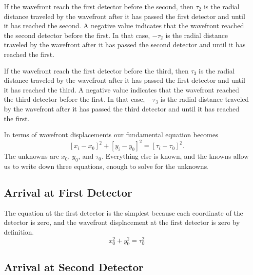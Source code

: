 \documentclass[twocolumn]{article}
\begin{document}
If the wavefront reach the first detector before the second, then $\tau_2$ is
the radial distance traveled by the wavefront after it has passed the first
detector and until it has reached the second.  A negative value indicates that
the wavefront reached the second detector before the first.  In that case,
$-\tau_2$ is the radial distance traveled by the wavefront after it has passed
the second detector and until it has reached the first.

If the wavefront reach the first detector before the third, then $\tau_3$ is
the radial distance traveled by the wavefront after it has passed the first
detector and until it has reached the third.  A negative value indicates that
the wavefront reached the third detector before the first.  In that case,
$-\tau_3$ is the radial distance traveled by the wavefront after it has passed
the third detector and until it has reached the first.

In terms of wavefront displacements our fundamental equation becomes
\begin{equation}
   \left[x_i - x_0\right]^2 + \left[y_i - y_0\right]^2 = \left[\tau_i -
   \tau_0\right]^2.
\end{equation}
The unknowns are $x_0$, $y_0$, and $\tau_0$. Everything else is known, and the
knowns allow us to write down three equations, enough to solve for the
unknowns.

\subsection{Arrival at First Detector}

The equation at the first detector is the simplest because each coordinate of
the detector is zero, and the wavefront displacement at the first detector is
zero by definition.
\begin{equation}
   x_0^2 + y_0^2 = \tau_0^2
   \label{eq:first}
\end{equation}

\subsection{Arrival at Second Detector}
\end{document}

